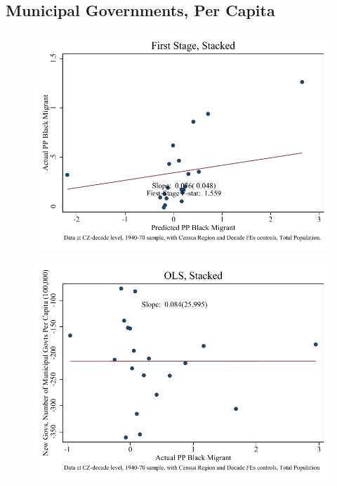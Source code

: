 \documentclass{article}
\begin{document}
\subsection{Municipal Governments, Per Capita}

\clearpage
\begin{figure}
\centering
\includegraphics{figures/simplefigs/stacked_gen_muni_pc_C3_total_fs.pdf}
\end{figure}
\clearpage
\begin{figure}
\centering
\includegraphics{figures/simplefigs/stacked_gen_muni_pc_C3_total_ols.pdf}
\end{figure}
\clearpage
\end{document}
